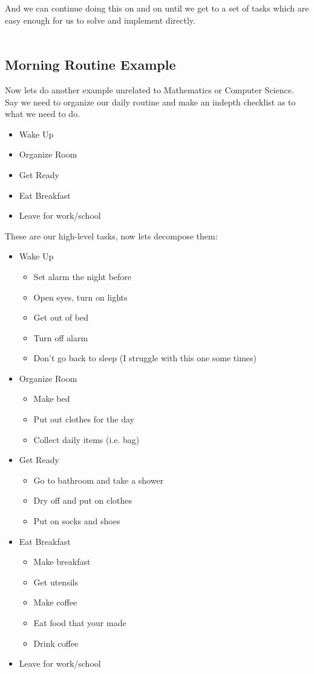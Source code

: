 \documentclass[12pt,a4paper]{book}
\begin{document}
				And we can continue doing this on and on until we get to a set of tasks which are easy enough for us to solve and implement directly. \\
				\\
		\subsection{Morning Routine Example}
			Now lets do another example unrelated to Mathematics or Computer Science. Say we need to organize our daily routine and make an indepth checklist as to what we need to do.
			\begin{itemize}
				\item Wake Up
				\item Organize Room
				\item Get Ready
				\item Eat Breakfast
				\item Leave for work/school
			\end{itemize}
			These are our high-level tasks, now lets decompose them:
			\begin{itemize}
				\item Wake Up
					\begin{itemize}
						\item Set alarm the night before
						\item Open eyes, turn on lights
						\item Get out of bed
						\item Turn off alarm
						\item Don't go back to sleep (I struggle with this one some times)
					\end{itemize}
				\item Organize Room
					\begin{itemize}
						\item Make bed
						\item Put out clothes for the day
						\item Collect daily items (i.e. bag)
					\end{itemize}
				\item Get Ready
					\begin{itemize}
						\item Go to bathroom and take a shower
						\item Dry off and put on clothes
						\item Put on socks and shoes
					\end{itemize}	
				\item Eat Breakfast
					\begin{itemize}
						\item Make breakfast
						\item Get utensils
						\item Make coffee
						\item Eat food that your made
						\item Drink coffee
					\end{itemize}
				\item Leave for work/school
			\end{itemize}
\end{document}
